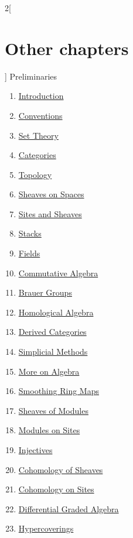 \setlength\columnsep{-1cm}
\begin{multicols}{2}[\section{Other chapters}]
\noindent
Preliminaries
\begin{enumerate}
\item \hyperref[introduction-section-phantom]{Introduction}
\item \hyperref[conventions-section-phantom]{Conventions}
\item \hyperref[sets-section-phantom]{Set Theory}
\item \hyperref[categories-section-phantom]{Categories}
\item \hyperref[topology-section-phantom]{Topology}
\item \hyperref[sheaves-section-phantom]{Sheaves on Spaces}
\item \hyperref[sites-section-phantom]{Sites and Sheaves}
\item \hyperref[stacks-section-phantom]{Stacks}
\item \hyperref[fields-section-phantom]{Fields}
\item \hyperref[algebra-section-phantom]{Commutative Algebra}
\item \hyperref[brauer-section-phantom]{Brauer Groups}
\item \hyperref[homology-section-phantom]{Homological Algebra}
\item \hyperref[derived-section-phantom]{Derived Categories}
\item \hyperref[simplicial-section-phantom]{Simplicial Methods}
\item \hyperref[more-algebra-section-phantom]{More on Algebra}
\item \hyperref[smoothing-section-phantom]{Smoothing Ring Maps}
\item \hyperref[modules-section-phantom]{Sheaves of Modules}
\item \hyperref[sites-modules-section-phantom]{Modules on Sites}
\item \hyperref[injectives-section-phantom]{Injectives}
\item \hyperref[cohomology-section-phantom]{Cohomology of Sheaves}
\item \hyperref[sites-cohomology-section-phantom]{Cohomology on Sites}
\item \hyperref[dga-section-phantom]{Differential Graded Algebra}
\item \hyperref[hypercovering-section-phantom]{Hypercoverings}

\end{enumerate}
\end{multicols}
